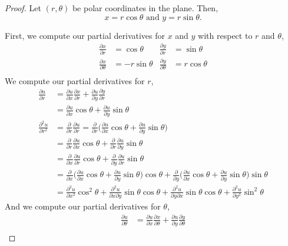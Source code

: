 \documentclass[12pt]{article}
\begin{document}
\begin{enumerate}
\begin{proof}
Let $(r,\theta)$ be polar coordinates in the plane. Then, 
$$x = r\cos \theta \text{ and } y = r\sin \theta.$$

First, we compute our partial derivatives for $x$ and $y$ with respect to $r$ and $\theta$,
\begin{align*}
\frac{\partial x}{\partial r} &= \cos \theta & \frac{\partial y}{\partial r} &= \sin \theta \\
\frac{\partial x}{\partial \theta} &= -r\sin \theta & \frac{\partial y}{\partial \theta} &= r\cos \theta \\
\end{align*}
We compute our partial derivatives for $r$,
\begin{align*}
\frac{\partial u}{\partial r}&=\frac{\partial u}{\partial x}\frac{\partial x}{\partial r}+\frac{\partial u}{\partial y}\frac{\partial y}{\partial r} \\
&= \frac{\partial u}{\partial x}\cos \theta + \frac{\partial u}{\partial y} \sin \theta \\
\frac{\partial^2 u}{\partial r^2}&=\frac{\partial}{\partial r}\frac{\partial u}{\partial r} = \frac{\partial }{\partial r}\Big(\frac{\partial u}{\partial x}\cos\theta + \frac{\partial u}{\partial y} \sin \theta\Big) \\
&= \frac{\partial }{\partial r}\frac{\partial u}{\partial x}\cos\theta + \frac{\partial }{\partial r}\frac{\partial u}{\partial y} \sin \theta \\
&= \frac{\partial }{\partial x}\frac{\partial u}{\partial r}\cos\theta + \frac{\partial }{\partial y}\frac{\partial u}{\partial r} \sin \theta \\
&= \frac{\partial }{\partial x}\Big(\frac{\partial u}{\partial x}\cos\theta + \frac{\partial u}{\partial y} \sin \theta\Big)\cos\theta + \frac{\partial }{\partial y}\Big(\frac{\partial u}{\partial x}\cos\theta + \frac{\partial u}{\partial y} \sin \theta\Big) \sin \theta \\
&= \frac{\partial^2 u}{\partial x^2}\cos^2 \theta + \frac{\partial^2 u}{\partial x \partial y}\sin \theta \cos \theta + \frac{\partial^2 u}{\partial y \partial x}\sin \theta \cos \theta + \frac{\partial^2 u}{\partial y^2}\sin^2 \theta
\end{align*}
And we compute our partial derivatives for $\theta$,
\begin{align*}
\frac{\partial u}{\partial \theta}&=\frac{\partial u}{\partial x}\frac{\partial x}{\partial \theta}+\frac{\partial u}{\partial y}\frac{\partial y}{\partial \theta} \\

\end{align*}
\end{proof}
\end{enumerate}
\end{document}
